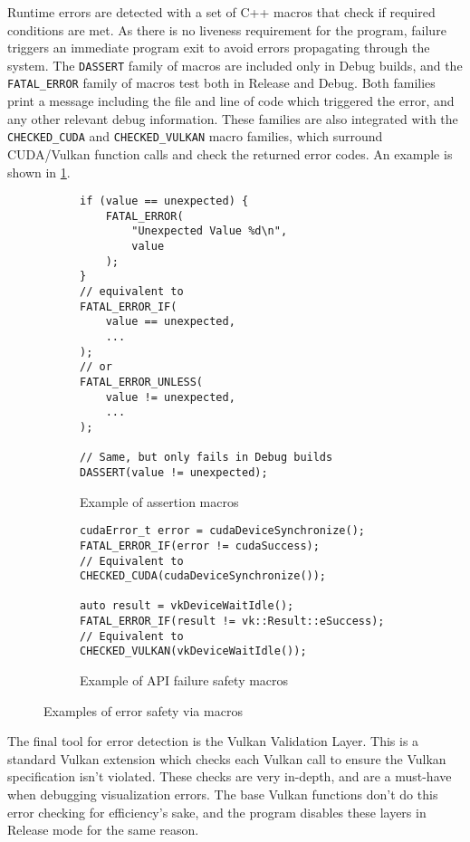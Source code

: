 Runtime errors are detected with a set of C++ macros that check if required conditions are met.
As there is no liveness requirement for the program, failure triggers an immediate program exit to avoid errors propagating through the system.
The \texttt{DASSERT} family of macros are included only in Debug builds, and the \texttt{FATAL\_ERROR} family of macros test both in Release and Debug.
Both families print a message including the file and line of code which triggered the error, and any other relevant debug information.
These families are also integrated with the \texttt{CHECKED\_CUDA} and \texttt{CHECKED\_VULKAN} macro families, which surround CUDA/Vulkan function calls and check the returned error codes.
An example is shown in \cref{fig:ImplAssertions}.
\begin{figure}[t]
    \centering
    \begin{subfigure}{0.49\textwidth}
        \begin{verbatim}
if (value == unexpected) {
    FATAL_ERROR(
        "Unexpected Value %d\n",
        value
    );
}
// equivalent to
FATAL_ERROR_IF(
    value == unexpected,
    ...
);
// or
FATAL_ERROR_UNLESS(
    value != unexpected,
    ...
);

// Same, but only fails in Debug builds
DASSERT(value != unexpected);
        \end{verbatim}
        \caption{Example of assertion macros}
    \end{subfigure}%
    \begin{subfigure}{0.49\textwidth}
        \begin{verbatim}
cudaError_t error = cudaDeviceSynchronize();
FATAL_ERROR_IF(error != cudaSuccess);
// Equivalent to
CHECKED_CUDA(cudaDeviceSynchronize());

auto result = vkDeviceWaitIdle();
FATAL_ERROR_IF(result != vk::Result::eSuccess);
// Equivalent to
CHECKED_VULKAN(vkDeviceWaitIdle());
        \end{verbatim}
        \caption{Example of API failure safety macros}
    \end{subfigure}
    \caption{Examples of error safety via macros}
    \label{fig:ImplAssertions}
\end{figure}

The final tool for error detection is the Vulkan Validation Layer.
This is a standard Vulkan extension which checks each Vulkan call to ensure the Vulkan specification \cite{TheKhronosGroupVulkanSpec} isn't violated.
These checks are very in-depth, and are a must-have when debugging visualization errors.
The base Vulkan functions don't do this error checking for efficiency's sake, and the program disables these layers in Release mode for the same reason.

